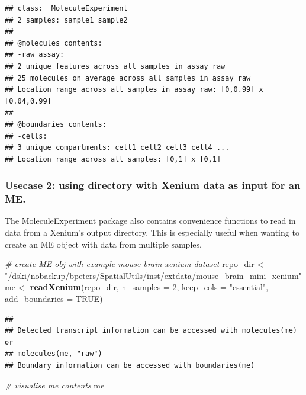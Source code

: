 \documentclass[
]{article}
\newenvironment{Shaded}{\begin{snugshade}}{\end{snugshade}}
\newcommand{\CommentTok}[1]{\textcolor[rgb]{0.56,0.35,0.01}{\textit{#1}}}
\newcommand{\DataTypeTok}[1]{\textcolor[rgb]{0.13,0.29,0.53}{#1}}
\newcommand{\DecValTok}[1]{\textcolor[rgb]{0.00,0.00,0.81}{#1}}
\newcommand{\KeywordTok}[1]{\textcolor[rgb]{0.13,0.29,0.53}{\textbf{#1}}}
\newcommand{\NormalTok}[1]{#1}
\newcommand{\OtherTok}[1]{\textcolor[rgb]{0.56,0.35,0.01}{#1}}
\newcommand{\StringTok}[1]{\textcolor[rgb]{0.31,0.60,0.02}{#1}}
\begin{document}
\begin{verbatim}
## class:  MoleculeExperiment 
## 2 samples: sample1 sample2 
## 
## @molecules contents: 
## -raw assay:
## 2 unique features across all samples in assay raw
## 25 molecules on average across all samples in assay raw
## Location range across all samples in assay raw: [0,0.99] x [0.04,0.99]
## 
## @boundaries contents:
## -cells:
## 3 unique compartments: cell1 cell2 cell3 cell4 ...
## Location range across all samples: [0,1] x [0,1]
\end{verbatim}

\hypertarget{usecase-2-using-directory-with-xenium-data-as-input-for-an-me.}{%
\subsubsection{Usecase 2: using directory with Xenium data as input for
an
ME.}\label{usecase-2-using-directory-with-xenium-data-as-input-for-an-me.}}

The MoleculeExperiment package also contains convenience functions to
read in data from a Xenium's output directory. This is especially useful
when wanting to create an ME object with data from multiple samples.

\begin{Shaded}
\begin{Highlighting}[]
\CommentTok{\# create ME obj with example mouse brain xenium dataset}
\NormalTok{repo\_dir \textless{}{-}}\StringTok{ "/dski/nobackup/bpeters/SpatialUtils/inst/extdata/mouse\_brain\_mini\_xenium"}
\NormalTok{me \textless{}{-}}\StringTok{ }\KeywordTok{readXenium}\NormalTok{(repo\_dir,}
                  \DataTypeTok{n\_samples =} \DecValTok{2}\NormalTok{,}
                  \DataTypeTok{keep\_cols =} \StringTok{"essential"}\NormalTok{,}
                  \DataTypeTok{add\_boundaries =} \OtherTok{TRUE}\NormalTok{)}
\end{Highlighting}
\end{Shaded}

\begin{verbatim}
## 
## Detected transcript information can be accessed with molecules(me) or
## molecules(me, "raw")
## Boundary information can be accessed with boundaries(me)
\end{verbatim}

\begin{Shaded}
\begin{Highlighting}[]
\CommentTok{\# visualise me contents}
\NormalTok{me}
\end{Highlighting}
\end{Shaded}
\end{document}
